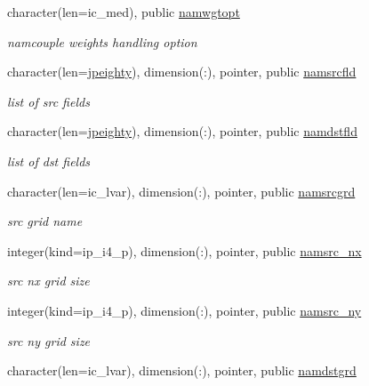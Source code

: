\begin{DoxyCompactItemize}
character(len=ic\+\_\+med), public \hyperlink{namespacemod__oasis__namcouple_a03a63fe10e98e695e556ee190cd3accc}{namwgtopt}
\begin{DoxyCompactList}\small\item\em namcouple weights handling option \end{DoxyCompactList}\item 
character(len=\hyperlink{namespacemod__oasis__namcouple_a4fb10ad6e864dcbe34c4a8b02204a523}{jpeighty}), dimension(\+:), pointer, public \hyperlink{namespacemod__oasis__namcouple_a5fcb5a4f2a49f414fafe38b03c5c089d}{namsrcfld}
\begin{DoxyCompactList}\small\item\em list of src fields \end{DoxyCompactList}\item 
character(len=\hyperlink{namespacemod__oasis__namcouple_a4fb10ad6e864dcbe34c4a8b02204a523}{jpeighty}), dimension(\+:), pointer, public \hyperlink{namespacemod__oasis__namcouple_ac4cfec209e4169b6098f9a8b9be1ffb1}{namdstfld}
\begin{DoxyCompactList}\small\item\em list of dst fields \end{DoxyCompactList}\item 
character(len=ic\+\_\+lvar), dimension(\+:), pointer, public \hyperlink{namespacemod__oasis__namcouple_a589c1bae58b10bcb0cfb30c0893a7895}{namsrcgrd}
\begin{DoxyCompactList}\small\item\em src grid name \end{DoxyCompactList}\item 
integer(kind=ip\+\_\+i4\+\_\+p), dimension(\+:), pointer, public \hyperlink{namespacemod__oasis__namcouple_ac8f6c8fe3720739f3d26431a8a600506}{namsrc\+\_\+nx}
\begin{DoxyCompactList}\small\item\em src nx grid size \end{DoxyCompactList}\item 
integer(kind=ip\+\_\+i4\+\_\+p), dimension(\+:), pointer, public \hyperlink{namespacemod__oasis__namcouple_ab82c80f007b37865172ddb033a1abb36}{namsrc\+\_\+ny}
\begin{DoxyCompactList}\small\item\em src ny grid size \end{DoxyCompactList}\item 
character(len=ic\+\_\+lvar), dimension(\+:), pointer, public \hyperlink{namespacemod__oasis__namcouple_a7a2ed64b0670db38d2287f5d452060e4}{namdstgrd}

\end{DoxyCompactItemize}
